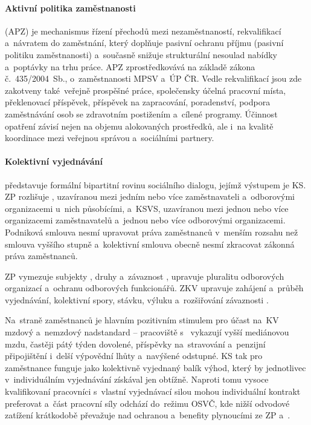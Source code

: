 \paragraph{Aktivní politika zaměstnanosti} (\acs{APZ}) je mechanismus řízení přechodů mezi nezaměstnaností, rekvalifikací a~návratem do zaměstnání, který doplňuje pasivní ochranu příjmu (pasivní politiku zaměstnanosti) a~současně snižuje strukturální nesoulad nabídky a~poptávky na trhu práce. \Ac{APZ} zprostředkovává na základě zákona č.~435/2004~Sb., o~zaměstnanosti \ac{MPSV} a~\ac{ÚP ČR}. Vedle rekvalifikací jsou zde zakotveny také~veřejně prospěšné práce, společensky účelná pracovní místa, překlenovací příspěvek, příspěvek na zapracování, poradenství, podpora zaměstnávání osob se zdravotním postižením a~cílené programy. Účinnost opatření závisí nejen na objemu alokovaných prostředků, ale i~na kvalitě koordinace mezi veřejnou správou a~sociálními partnery.~\cite{zakon_zz_2004}\par

\paragraph{Kolektivní vyjednávání} představuje formální bipartitní rovinu sociálního dialogu, jejímž výstupem je \ac{KS}. \Ac{ZP} rozlišuje , uzavíranou mezi jedním nebo více zaměstnavateli a~odborovými organizacemi u~nich působícími, a~\ac{KSVS}, uzavíranou mezi jednou nebo více organizacemi zaměstnavatelů a~jednou nebo více odborovými organizacemi. Podniková smlouva nesmí upravovat práva zaměstnanců v~menším rozsahu než smlouva vyššího stupně a~kolektivní smlouva obecně nesmí zkracovat zákonná práva zaměstnanců.\par
\Ac{ZP} vymezuje subjekty , druhy a~závaznost , upravuje pluralitu odborových organizací a~ochranu odborových funkcionářů. \Ac{ZKV} upravuje zahájení a~průběh vyjednávání, kolektivní spory, stávku, výluku a~rozšiřování závaznosti .~\cite{zakon_zp_2006}~\cite{zakon_kv_1991}

Na~straně zaměstnanců je hlavním pozitivním stimulem pro účast na~\ac{KV} mzdový a~nemzdový nadstandard -- pracoviště s~ vykazují vyšší mediánovou mzdu, častěji pátý týden dovolené, příspěvky na~stravování a~penzijní připojištění i~delší výpovědní lhůty a~navýšené odstupné. \Ac{KS} tak pro zaměstnance funguje jako kolektivně vyjednaný balík výhod, který by jednotlivec v~individuálním vyjednávání získával jen obtížně. Naproti tomu vysoce kvalifikovaní pracovníci s~vlastní vyjednávací silou mohou individuální kontrakt preferovat a~část pracovní síly odchází do~režimu \acs{OSVČ}, kde nižší odvodové zatížení krátkodobě převažuje nad ochranou a~benefity plynoucími ze \ac{ZP} a~.~\cite{CMKOS_PrinosKV2025}~\cite{PAQ_Svarcsystem}\par

